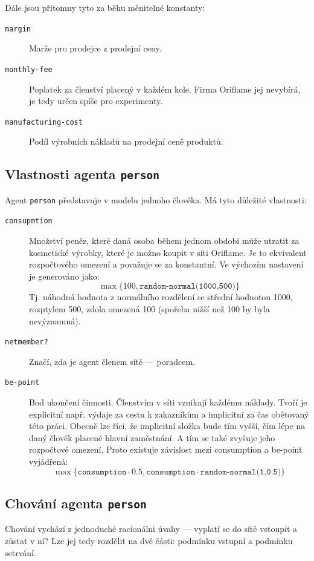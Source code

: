 \documentclass[a4wide,12pt]{report}
\begin{document}
Dále jsou přítomny tyto za běhu měnitelné konstanty:
\begin{description}
\item[\texttt{margin}] Marže pro prodejce z prodejní ceny.
\item[\texttt{monthly-fee}] Poplatek za členství placený v každém kole. Firma Oriflame jej nevybírá, je tedy určen spíše pro experimenty.
\item[\texttt{manufacturing-cost}] Podíl výrobních nákladů na prodejní ceně produktů.
\end{description}
\subsection{Vlastnosti agenta \texttt{person}}
\label{sec:vl_agenta}
Agent \texttt{person} představuje v modelu jednoho člověka. Má tyto důležité vlastnosti:
\begin{description}
\item[\texttt{consupmtion}] Množství peněz, které daná osoba během jednom období může utratit za kosmetické výrobky, které je možno koupit v síti Oriflame. Je to ekvivalent rozpočtového omezení a považuje se za konstantní. Ve výchozím nastavení je generováno jako:
$$\max\{100,\texttt{random-normal(1000,500)}\}$$
Tj. náhodná hodnota z normálního rozdělení se střední hodnotou 1000, rozptylem 500, zdola omezená 100 (spořeba nižší než 100 by byla nevýznamná).
\item[\texttt{netmember?}] Značí, zda je agent členem sítě --- poradcem.
\item[\texttt{be-point}] Bod ukončení činnosti. Členstvím v síti vznikají každému náklady. Tvoří je explicitní např. výdaje za cestu k zakazníkům a implicitní za čas obětovaný této práci. Obecně lze říci, že implicitní složka bude tím vyšší, čím lépe na daný člověk placené hlavní zaměstnání. A tím se také zvyšuje jeho rozpočtové omezení. Proto existuje závislost mezi consumption a be-point vyjádřená:
$$\max\{\texttt{consumption}\cdot 0.5,\texttt{consumption}\cdot\texttt{random-normal(1,0.5)}\}$$
\end{description}
\subsection{Chování agenta \texttt{person}}
Chování vychází z jednoduché racionálni úvahy --- vyplatí se do sítě vstoupit a zůstat v ní? Lze jej tedy rozdělit na dvě části: podmínku vstupní a podmínku setrvání.
\end{document}
